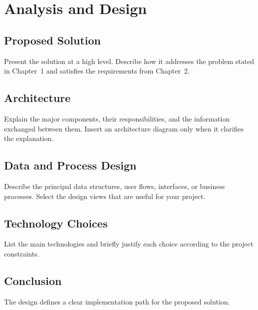 \chapter{Analysis and Design}
\label{chap:design}

\section{Proposed Solution}
Present the solution at a high level. Describe how it addresses the problem stated in Chapter~1 and satisfies the requirements from Chapter~2.

\section{Architecture}
Explain the major components, their responsibilities, and the information exchanged between them. Insert an architecture diagram only when it clarifies the explanation.

\section{Data and Process Design}
Describe the principal data structures, user flows, interfaces, or business processes. Select the design views that are useful for your project.

\section{Technology Choices}
List the main technologies and briefly justify each choice according to the project constraints.

\section*{Conclusion}
The design defines a clear implementation path for the proposed solution.
